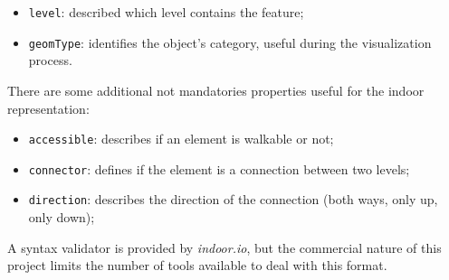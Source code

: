 \begin{itemize}
\itemsep1pt\parskip0pt
\item
 {\tt level}: described which level contains the feature;
\item
 {\tt geomType}: identifies the object's
 category, useful during the visualization
 process.
\end{itemize}

There are some additional not mandatories properties useful for
the indoor representation:

\begin{itemize}
\itemsep1pt\parskip0pt
\item
 {\tt accessible}: describes if an element is walkable or not;
\item
 {\tt connector}: defines if the element is a connection between two
 levels;
\item
 {\tt direction}: describes the direction of the connection (both
 ways, only up, only down);
\end{itemize}

A syntax validator is provided by \emph{indoor.io}, but the commercial nature
of this project limits the number of tools available to deal with this
format.
